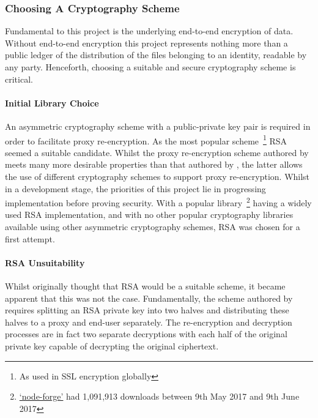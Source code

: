 \subsubsection{Choosing A Cryptography Scheme}

Fundamental to this project is the underlying end-to-end encryption of data. Without end-to-end encryption this project represents nothing more than a public ledger of the distribution of the files belonging to an identity, readable by any party. Henceforth, choosing a suitable and secure cryptography scheme is critical.

\paragraph{Initial Library Choice}

An asymmetric cryptography scheme with a public-private key pair is required in order to facilitate proxy re-encryption. As the most popular scheme~\footnote{As used in SSL encryption globally} RSA~\cite{rsa:1978:article} seemed a suitable candidate. Whilst the proxy re-encryption scheme authored by \cite{afgh:2006:article} meets many more desirable properties than that authored by \cite{ivandodis:2003:inproceedings}, the latter allows the use of different cryptography schemes to support proxy re-encryption. Whilst in a development stage, the priorities of this project lie in progressing implementation before proving security. With a popular library~\footnote{\href{https://www.npmjs.com/package/node-forge}{`node-forge'} had 1,091,913 downloads between 9th May 2017 and 9th June 2017} having a widely used RSA implementation, and with no other popular cryptography libraries available using other asymmetric cryptography schemes, RSA was chosen for a first attempt.

\paragraph{RSA Unsuitability}

Whilst originally thought that RSA would be a suitable scheme, it became apparent that this was not the case. Fundamentally, the scheme authored by \cite{ivandodis:2003:inproceedings} requires splitting an RSA private key into two halves and distributing these halves to a proxy and end-user separately. The re-encryption and decryption processes are in fact two separate decryptions with each half of the original private key capable of decrypting the original ciphertext.

